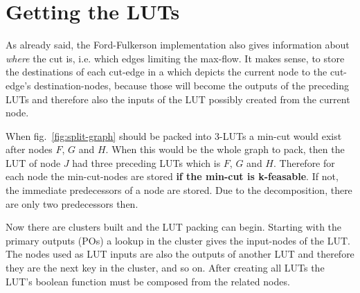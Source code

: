 \section{Getting the LUTs}
As already said, the Ford-Fulkerson implementation also gives information about \textit{where} the cut is, i.e. which edges limiting the max-flow. It makes sense, to store the destinations of each cut-edge in a  which depicts the current node to the cut-edge's destination-nodes, because those will become the outputs of the preceding LUTs and therefore also the inputs of the LUT possibly created from the current node.
\par
When fig.~\ref{fig:split-graph} should be packed into 3-LUTs a min-cut would exist after nodes $F$, $G$ and $H$. When this would be the whole graph to pack, then the LUT of node $J$ had three preceding LUTs which is $F$, $G$ and $H$. Therefore for each node the min-cut-nodes are stored \textbf{if the min-cut is k-feasable}. If not, the immediate predecessors of a node are stored. Due to the decomposition, there are only two predecessors then.
\par
Now there are clusters built and the LUT packing can begin. Starting with the primary outputs (POs) a lookup in the cluster gives the input-nodes of the LUT. The nodes used as LUT inputs are also the outputs of another LUT and therefore they are the next key in the cluster, and so on. After creating all LUTs the LUT's boolean function must be composed from the related nodes.

